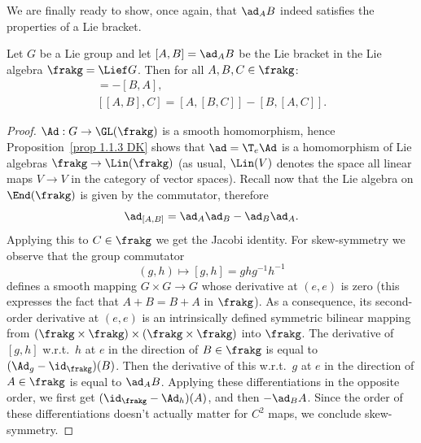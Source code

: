 We are finally ready to show, once again, that $\ad_A B$ indeed satisfies the properties of a Lie bracket.

\begin{thm}
    Let $G$ be a Lie group and let $[A,B]=\ad_A B$ be the Lie bracket in the Lie algebra $\frakg=\Lief G$. Then for all $A,B,C\in\frakg$:
    \begin{gather}
        [A,B]=-[B,A],\\
        [[A,B],C]=[A,[B,C]]-[B,[A,C]].
    \end{gather}
\end{thm}
\begin{proof}
    $\Ad:G\to \GL(\frakg)$ is a smooth homomorphism, hence Proposition~\ref{prop 1.1.3 DK} shows that $\ad=\T_e\Ad$ is a homomorphism of Lie algebras $\frakg\to \Lin(\frakg)$ (as usual, $\Lin(V)$ denotes the space all linear maps $V\to V$ in the category of vector spaces). Recall now that the Lie algebra on $\End(\frakg)$ is given by the commutator, therefore
    \[\ad_{[A,B]}=\ad_A \ad_B-\ad_B \ad_A.\]
    Applying this to $C\in\frakg$ we get the Jacobi identity. For skew-symmetry we observe that the group commutator 
    \[(g,h)\mapsto [g,h]=ghg^{-1}h^{-1}\]
    defines a smooth mapping $G\times G\to G$ whose derivative at $(e,e)$ is zero (this expresses the fact that $A+B=B+A$ in $\frakg$). As a consequence, its second-order derivative at $(e,e)$ is an intrinsically defined symmetric bilinear mapping from $(\frakg\times\frakg)\times(\frakg\times\frakg)$ into $\frakg$. The derivative of $[g,h]$ w.r.t.\ $h$ at $e$ in the direction of $B\in\frakg$ is equal to $(\Ad_g-\id_\frakg)(B)$. Then the derivative of this w.r.t.\ $g$ at $e$ in the direction of $A\in\frakg$ is equal to $\ad_A B$. Applying these differentiations in the opposite order, we first get $(\id_\frakg-\Ad_h)(A)$, and then $-\ad_B A$. Since the order of these differentiations doesn't actually matter for $C^2$ maps, we conclude skew-symmetry.
\end{proof}


